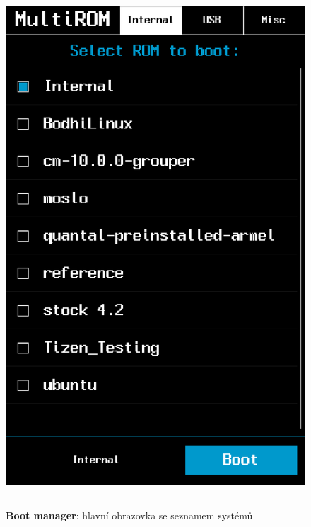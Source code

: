 \documentclass[12pt, a4paper, oneside]{article}
\newcommand{\B}{\textbf} %
\begin{document}
\begin{figure}[H]
\begin{center}
 \includegraphics[height=550pt]{img/boot_manager.png}
\caption{\B{Boot manager}: hlavní obrazovka se seznamem systémů}
\end{center}
\end{figure}

\newpage
\addtolength{\footskip}{-70pt}
\end{document}
